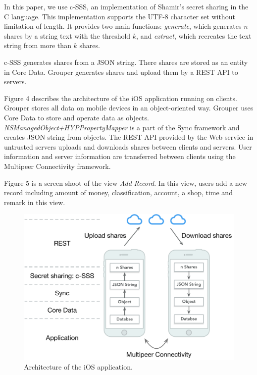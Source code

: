 \documentclass[twocolumn,10pt]{article}
\begin{document}
In this paper, we use c-SSS\cite{c-sss}, an implementation of Shamir's secret sharing in the C language. This implementation supports the UTF-8 character set without limitation of length. It provides two main functions: \emph{generate}, which generates $n$ shares by a string text with the threshold $k$, and \emph{extract}, which recreates the text string from more than $k$ shares. 

c-SSS generates shares from a JSON string. There shares are stored as an entity in Core Data. Grouper generates shares and upload them by a REST API to servers.

Figure 4 describes the architecture of the iOS application running on clients. Grouper stores all data on mobile devices in an object-oriented way. Grouper uses Core Data to store and operate data as objects. \emph{NSManagedObject+HYPPropertyMapper} is a part of the Sync framework and creates JSON string from objects. The REST API provided by the Web service in untrusted servers uploads and downloads shares between clients and servers. User information and server information are transferred between clients using the Multipeer Connectivity framework.

Figure 5 is a screen shoot of the view \emph{Add Record}. In this view, users add a new record including amount of money, classification, account, a shop, time and remark in this view.

\begin{figure}[t]
	\centering
	\includegraphics[scale=0.35]{architecture}
	\caption{Architecture of the iOS application.}
\end{figure}
\end{document}
